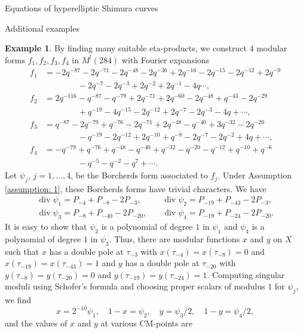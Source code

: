 \documentclass{amsart}
\newcounter{lemma}
\theoremstyle{definition}
\newtheorem{Example}[lemma]{Example}
\def\div{\operatorname{div}}
\begin{document}
\begin{section}{Equations of hyperelliptic Shimura curves}
\begin{subsection}{Additional examples}
\begin{Example}
By finding many suitable eta-products, we construct $4$ modular forms
$f_1,f_2,f_3,f_4$ in $M^!(284)$ with Fourier expansions
\begin{equation*}
\begin{split}
  f_1&=-2q^{-87} - 2q^{-71} - 2q^{-48} - 2q^{-36} + 2q^{-16} - 2q^{-15} - 
    2q^{-12} + 2q^{-9} \\
  &\qquad\qquad  - 2q^{-7} - 2q^{-3} + 2q^{-2} +
  2q^{-1} - 4q\cdots, \\
  f_2&=2q^{-116} - q^{-87} - q^{-79} + 2q^{-71} + 2q^{-60} - 2q^{-48} + q^{-43} - 
    2q^{-29} \\
  &\qquad\qquad + q^{-19} - 4q^{-15} - 2q^{-12} + 2q^{-7} - 2q^{-3} -4q +\cdots,
    \\
  f_3&=q^{-87} - 2q^{-79} + q^{-76} - 2q^{-71} + 2q^{-48} - q^{-40} + 3q^{-32} - 
    2q^{-20} \\
  &\qquad\qquad - q^{-19} - 2q^{-12} + 2q^{-10} + q^{-8} - 2q^{-7} -
    2q^{-2} + 4q + \cdots, \\
  f_4&=-q^{-79} + q^{-76} + q^{-48} - q^{-40} + q^{-32} - q^{-20} - q^{-12} + q^{-10} +
    q^{-6} \\
  &\qquad\qquad - q^{-5} - q^{-2} - q^7 +\cdots.
\end{split}
\end{equation*}
Let $\psi_j$, $j=1,\ldots,4$, be the Borcherds form associated to
$f_j$. Under Assumption \ref{assumption: 1}, these Borcherds forms
have trivial characters. We have
\begin{equation*}
\begin{split}
  \div\psi_{1}=P_{-4}+P_{-8}-2P_{-3}, \quad
 &\div\psi_{2}=P_{-19}+P_{-43}-2P_{-3}, \\
  \div\psi_{3}=P_{-8}+P_{-40}-2P_{-20}, \quad
 &\div\psi_{4}=P_{-19}+P_{-24}-2P_{-20}.
\end{split}
\end{equation*}
It is easy to show that $\psi_{2}$ is a polynomial of degree $1$ in
$\psi_{1}$ and $\psi_{4}$ is a polynomial of degree $1$ in
$\psi_{3}$. Thus, there are modular functions $x$ and $y$ on
$X$ such that $x$ has a double pole at $\tau_{-3}$ with
$x(\tau_{-4})=x(\tau_{-8})=0$ and $x(\tau_{-19})=x(\tau_{-43})=1$ and $y$ has a
double pole at $\tau_{-20}$ with $y(\tau_{-8})=y(\tau_{-20})=0$ and
$y(\tau_{-19})=y(\tau_{-24})=1$. Computing singular moduli using Schofer's
formula and choosing proper scalars of modulus $1$ for $\psi_j$, we find
$$
  x=2^{-10}\psi_{1}, \quad 1-x=\psi_{2}, \quad
  y=\psi_{3}/2, \quad 1-y=\psi_{4}/2,
$$
and the values of $x$ and $y$ at various CM-points are

\end{Example}
\end{subsection}
\end{section}
\end{document}

